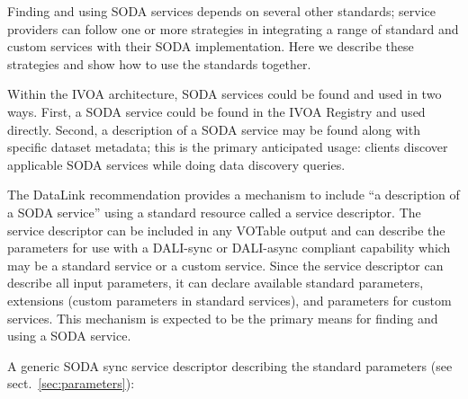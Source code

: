 \documentclass[11pt,a4paper]{ivoa}
\begin{document}
Finding and using SODA services depends on several other standards;
service providers can follow one or more strategies in integrating a
range of standard and custom services with their SODA implementation.
Here we describe these strategies and show how to use the standards
together.

Within the IVOA architecture, SODA services could be found and used in two
ways. First, a SODA service could be found in the IVOA Registry and used
directly. Second, a description of a SODA service may be found along
with specific dataset metadata; this is the primary anticipated usage:
clients discover applicable SODA services while doing data discovery
queries.

The DataLink recommendation provides a mechanism
to include ``a description of a SODA service'' using a standard resource
called a service descriptor. The service descriptor can be included in any
VOTable \citep{2013ivoa.spec.0920O} output and can describe the parameters for
use with a DALI-sync or DALI-async compliant capability which may be a standard
 service or a custom service. Since the service descriptor can describe all input parameters,
it can declare available standard parameters, extensions (custom
parameters in standard services), and parameters for custom services.
This mechanism is expected to be the primary means for finding and using
a SODA service. 

A generic SODA sync service descriptor describing the standard
parameters (see sect.~\ref{sec:parameters}):
\end{document}
